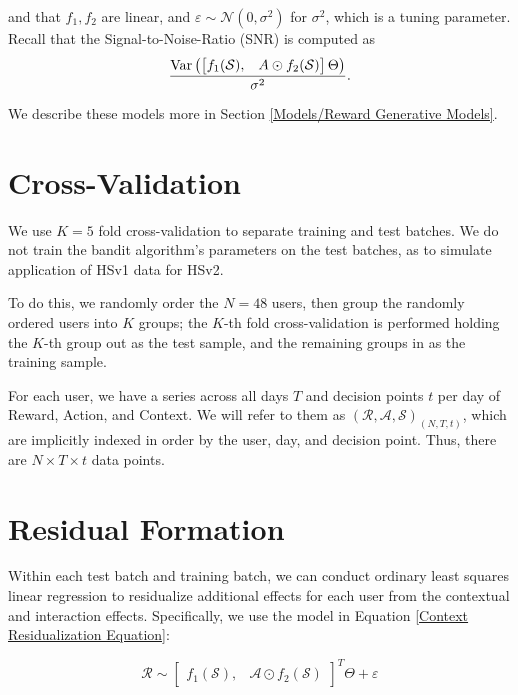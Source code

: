and that $f_1, f_2$ are linear, and $\varepsilon \sim \mathcal{N}\left(0, \sigma^2 \right)$ for $\sigma^2$, which is a tuning parameter.  Recall that the Signal-to-Noise-Ratio (SNR) is computed as 
\begin{equation}
\label{SNR equation}
	\frac{\mathrm{Var}\left(\begin{bmatrix}
f_1(\mathcal{S}), & A \odot f_2(\mathcal{S})	
\end{bmatrix}\Theta\right)}{\sigma^2}.
\end{equation}

We describe these models more in Section \ref{Models/Reward Generative Models}.





\section{Cross-Validation}

We use $K = 5$ fold cross-validation to separate training and test batches.  We do not train the bandit algorithm's parameters on the test batches, as to simulate  application of HSv1 data for HSv2.  

To do this, we randomly order the $N = 48$ users, then group the randomly ordered users into $K$ groups; the $K$-th fold cross-validation is performed holding the $K$-th group out as the test sample, and the remaining groups in as the training sample.

For each user, we have a series across all days $T$ and decision points $t$ per day of Reward, Action, and Context.  We will refer to them as $(\mathcal{R}, \mathcal{A}, \mathcal{S})_{(N,T,t)}$, which are implicitly indexed in order by the user, day, and decision point.  Thus, there are $N \times T \times t$ data points.



\section{Residual Formation}

Within each test batch and training batch, we can conduct ordinary least squares linear regression to residualize additional effects for each user from the contextual and interaction effects.  Specifically, we use the model in Equation \ref{Context Residualization Equation}:

\begin{equation}
\label{Context Residualization Equation}
\mathcal{R} \sim
\begin{bmatrix}
f_1(\mathcal{S}), &
\mathcal{A} \odot f_2(\mathcal{S})
\end{bmatrix}^T \Theta + \varepsilon
\end{equation}

